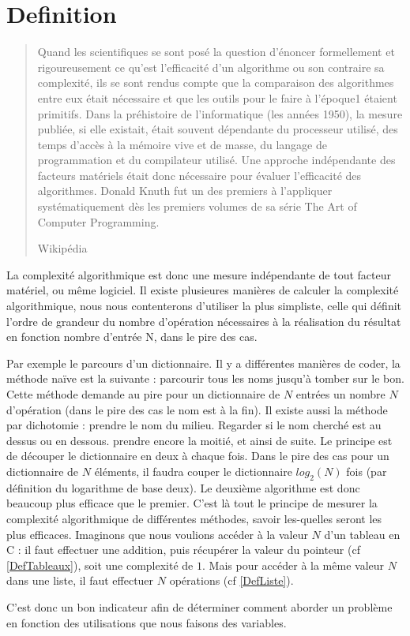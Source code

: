 \section{Definition}
  \begin{quotation}
    Quand les scientifiques se sont posé la question d'énoncer formellement et rigoureusement ce qu'est l'efficacité d'un algorithme ou son contraire sa complexité, ils se sont rendus compte que la comparaison des algorithmes entre eux était nécessaire et que les outils pour le faire à l'époque1 étaient primitifs. Dans la préhistoire de l'informatique (les années 1950), la mesure publiée, si elle existait, était souvent dépendante du processeur utilisé, des temps d'accès à la mémoire vive et de masse, du langage de programmation et du compilateur utilisé.
Une approche indépendante des facteurs matériels était donc nécessaire pour évaluer l'efficacité des algorithmes. Donald Knuth fut un des premiers à l'appliquer systématiquement dès les premiers volumes de sa série The Art of Computer Programming. 
    \begin{flushright}
      Wikipédia
    \end{flushright}
  \end{quotation}
  
  La complexité algorithmique est donc une mesure indépendante de tout facteur matériel, ou même logiciel.
  Il existe plusieures manières de calculer la complexité algorithmique, nous nous contenterons d'utiliser la plus 
  simpliste, celle qui définit l'ordre de grandeur du nombre d'opération nécessaires à la réalisation du résultat en 
  fonction nombre d'entrée N, dans le pire des cas.
  
  Par exemple le parcours d'un dictionnaire. Il y a différentes manières de coder, la méthode naïve est la suivante : parcourir tous les noms jusqu'à tomber sur le bon. Cette méthode demande au pire pour un dictionnaire de $N$ entrées un nombre $N$ d'opération (dans le pire des cas le nom est à la fin).
  Il existe aussi la méthode par dichotomie : prendre le nom du milieu. Regarder si le nom cherché est au dessus ou en dessous.
  prendre encore la moitié, et ainsi de suite. Le principe est de découper le dictionnaire en deux à chaque fois. Dans le pire des cas pour un dictionnaire de $N$ éléments, il faudra couper le dictionnaire $log_2(N)$ fois (par définition du logarithme de base deux).
  Le deuxième algorithme est donc beaucoup plus efficace que le premier. C'est là tout le principe de mesurer la complexité algorithmique de différentes méthodes, savoir les-quelles seront les plus efficaces.
    Imaginons que nous voulions accéder à la valeur $N$ d'un tableau en C : il faut effectuer une addition, puis récupérer la valeur du pointeur (cf \ref{DefTableaux}), soit une complexité de $1$.
    Mais pour accéder à la même valeur $N$ dans une liste, il faut effectuer $N$ opérations (cf \ref{DefListe}).
    
    C'est donc un bon indicateur afin de déterminer comment aborder un problème en fonction des utilisations que nous faisons des variables. 
